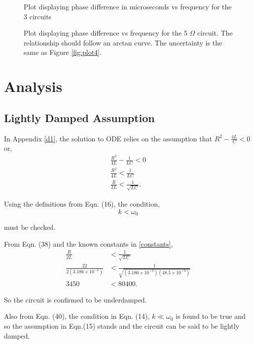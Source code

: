 \documentclass{article}
\begin{document}
\begin{figure}[H]
    \centering
    \scalebox{0.75}{}
    \caption{Plot displaying phase difference in microseconds vs frequency
    for the 3 circuits}
    \label{fig:plot8}
\end{figure}
\begin{figure}[H]
    \centering
    \scalebox{0.75}{}
    \caption{Plot displaying phase difference vs frequency for the 5 $\Omega$
    circuit. The relationship should follow an arctan curve. The uncertainty 
    is the same as Figure \ref{fig:plot4}.}
    \label{fig:plot9}
\end{figure}
\section{Analysis}
\subsection{Lightly Damped Assumption}
In Appendix \ref{d1}, the solution to ODE relies on the assumption that 
$R^2-\frac{4L}{C} < 0$ or,
\begin{equation}
    \begin{split}
        \frac{R^2}{4L} - \frac{1}{LC} < 0 \\
        \frac{R^2}{4L} < \frac{1}{LC} \\
        \frac{R}{2L} < \frac{1}{\sqrt{LC}}.
    \end{split}
\end{equation}

Using the definitions from Eqn. (16), the condition,
\begin{equation}
    k < \omega_0
\end{equation}

must be checked. 

From Eqn. (38) and the known constants in \ref{constants},
\begin{equation}
    \begin{split}
        \frac{R}{2L} &< \frac{1}{\sqrt{LC}} \\
        \frac{22}{2(3.186\times 10^{-3})} &< \frac{1}{\sqrt{(3.186\times 10^{-3})
        (48.5\times 10^{-9})}} \\
        3450 &< 80400.
    \end{split}
\end{equation}

So the circuit is confirmed to be underdamped.

Also from Eqn. (40), the condition in Eqn. (14), $k \ll \omega_0$ is found to be
true and so the assumption in Eqn.(15) stands and the circuit can be said to 
be lightly damped.
\end{document}
